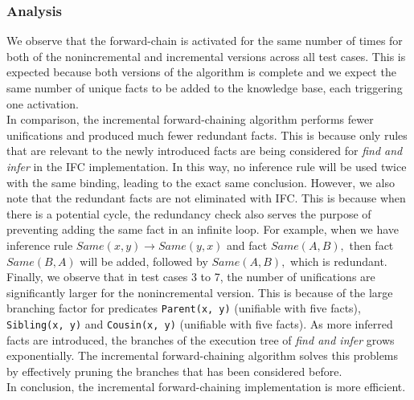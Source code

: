 \documentclass[letterpaper]{article}
\begin{document}
\subsubsection{Analysis}
We observe that the forward-chain is activated for the same number of times for both of the nonincremental and incremental versions across all test cases. This is expected because both versions of the algorithm is complete and we expect the same number of unique facts to be added to the knowledge base, each triggering one activation.\\
In comparison, the incremental forward-chaining algorithm performs fewer unifications and produced much fewer redundant facts. This is because only rules that are relevant to the newly introduced facts are being considered for \textit{find and infer} in the  IFC implementation. In this way, no inference rule will be used twice with the same binding, leading to the exact same conclusion. However, we also note that the redundant facts are not eliminated with IFC. This is because when there is a potential cycle, the redundancy check also serves the purpose of preventing adding the same fact in an infinite loop. For example, when we have inference rule $Same(x, y)\rightarrow Same(y,x)$ and fact $Same(A, B),$ then fact $Same(B, A)$ will be added, followed by $Same(A, B),$ which is redundant.\\
Finally, we observe that in test cases 3 to 7, the number of unifications are significantly larger for the nonincremental version. This is because of the large branching factor for predicates \texttt{Parent(x, y)} (unifiable with five facts), \texttt{Sibling(x, y)} and \texttt{Cousin(x, y)} (unifiable with five facts). As more inferred facts are introduced, the branches of the execution tree of \textit{find and infer} grows exponentially. The incremental forward-chaining algorithm solves this problems by effectively pruning the branches that has been considered before.\\
In conclusion, the incremental forward-chaining implementation is more efficient.

\label{LastPage}
\end{document}
